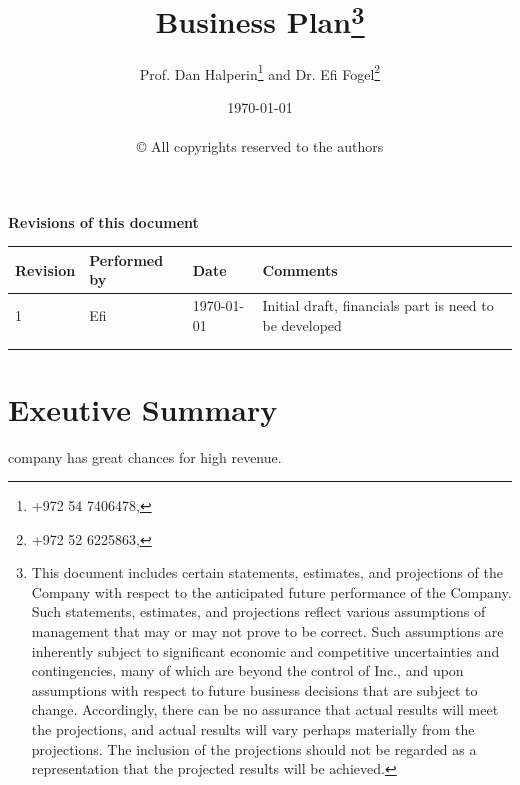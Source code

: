 \documentclass[11pt,a4paper,titlepage]{article}
\begin{document}
\title{{\Huge\textsc{\ego}}\\Business Plan\thanks{This document includes certain statements, estimates, and projections of the Company with respect to the anticipated future performance of the Company. Such statements, estimates, and projections reflect various assumptions of management that may or may not prove to be correct. Such assumptions are inherently subject to significant economic and competitive uncertainties and contingencies, many of which are beyond the control of \ego{} Inc., and upon assumptions with respect to future business decisions that are subject to change. Accordingly, there can be no assurance that actual results will meet the projections, and actual results will vary perhaps materially from the projections. The inclusion of the projections should not be regarded as a representation that the projected results will be achieved.}}
\author{Prof. Dan Halperin\thanks{+972 54 7406478, } and Dr. Efi Fogel\thanks{+972 52 6225863, }}
\date{\today\\~\\\copyright{} All copyrights reserved to the authors}
\thispagestyle{empty}
\maketitle
\tableofcontents
\textbf{Revisions of this document}\newline\newline\newline
\begin{tabular}{ | l | l | l | l |}\hline
  Revision & Performed by & Date & Comments \\ \hline
  1 & Efi & \today & Initial draft, financials part is need to be developed\\\hline
  & & &\\\hline
  & & &\\\hline
\end{tabular}
\section{Exeutive Summary}
company has great chances for high revenue.
\end{document}

